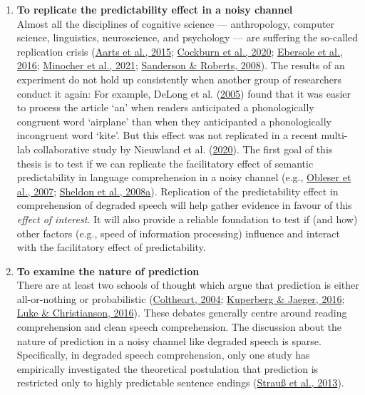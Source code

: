 \documentclass[a4paper, nobind]{templates/ociamthesis}
\begin{document}
\begin{enumerate}
\def\labelenumi{(\arabic{enumi})}
\item
  \textbf{To replicate the predictability effect in a noisy channel}\\
  Almost all the disciplines of cognitive science --- anthropology, computer science, linguistics, neuroscience, and psychology --- are suffering the so-called replication crisis (\protect\hyperlink{ref-OSC2015}{Aarts et al., 2015}; \protect\hyperlink{ref-Cockburn2020}{Cockburn et al., 2020}; \protect\hyperlink{ref-Ebersole2016}{Ebersole et al., 2016}; \protect\hyperlink{ref-Minocher2021}{Minocher et al., 2021}; \protect\hyperlink{ref-Sanderson2008}{Sanderson \& Roberts, 2008}).
  The results of an experiment do not hold up consistently when another group of researchers conduct it again:
  For example, DeLong et al. (\protect\hyperlink{ref-Delong2005}{2005}) found that it was easier to process the article `an' when readers anticipated a phonologically congruent word `airplane' than when they anticipanted a phonologically incongruent word `kite'.
  But this effect was not replicated in a recent multi-lab collaborative study by Nieuwland et al. (\protect\hyperlink{ref-Nieuwland2020a}{2020}).
  The first goal of this thesis is to test if we can replicate the facilitatory effect of semantic predictability in language comprehension in a noisy channel (e.g., \protect\hyperlink{ref-Obleser2007}{Obleser et al., 2007}; \protect\hyperlink{ref-Sheldon2008a}{Sheldon et al., 2008a}).
  Replication of the predictability effect in comprehension of degraded speech
  will help gather evidence in favour of this \emph{effect of interest}.
  It will also provide a reliable foundation to test if (and how) other factors (e.g., speed of information processing) influence and interact with the facilitatory effect of predictability.
\item
  \textbf{To examine the nature of prediction}\\
  There are at least two schools of thought which argue that prediction is either all-or-nothing or probabilistic (\protect\hyperlink{ref-Coltheart2004}{Coltheart, 2004}; \protect\hyperlink{ref-Kuperberg2016}{Kuperberg \& Jaeger, 2016}; \protect\hyperlink{ref-Luke2016}{Luke \& Christianson, 2016}).
  These debates generally centre around reading comprehension and clean speech comprehension.
  The discussion about the nature of prediction in a noisy channel like degraded speech is sparse.
  Specifically, in degraded speech comprehension, only one study has empirically investigated the theoretical postulation that prediction is restricted only to highly predictable sentence endings (\protect\hyperlink{ref-Strauss2013}{Strauß et al., 2013}).

\end{enumerate}
\end{document}
